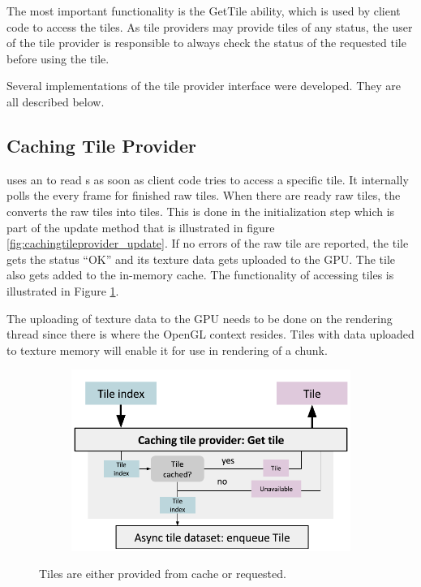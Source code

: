 The most important functionality is the GetTile ability, which is used by client code to access the tiles. As tile providers may provide tiles of any status, the user of the tile provider is responsible to always check the status of the requested tile before using the tile. 

Several implementations of the tile provider interface were developed. They are all described below.

\subsection{Caching Tile Provider}
 uses an  to read s as soon as client code tries to access a specific tile. It internally polls the  every frame for finished raw tiles. When there are ready raw tiles, the  converts the raw tiles into tiles. This is done in the initialization step which is part of the update method that is illustrated in figure \ref{fig:cachingtileprovider_update}. If no errors of the raw tile are reported, the tile gets the status ``OK'' and its texture data gets uploaded to the GPU. The tile also gets added to the in-memory cache. The functionality of accessing tiles is illustrated in Figure \ref{fig:cachingtileprovider_gettile}.

The uploading of texture data to the GPU needs to be done on the rendering thread since there is where the OpenGL context resides. Tiles with data uploaded to texture memory will enable it for use in rendering of a chunk.

\begin{figure}[htbp]
    \centering
    \begin{subfigure}[bt]{0.7\textwidth}
        \includegraphics[width=\textwidth]{figures/implementation/tileprovider/cachingtileprovider_gettile.pdf}
    \end{subfigure}
    \caption{Tiles are either provided from cache or requested.}
    \label{fig:cachingtileprovider_gettile}
\end{figure}

